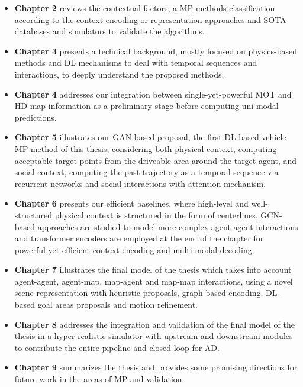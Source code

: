 \begin{itemize}
	
	\item \textbf{Chapter 2} reviews the contextual factors, a \ac{MP} methods classification according to the context encoding or representation approaches and \ac{SOTA} databases and simulators to validate the algorithms. 
	
	\item \textbf{Chapter 3} presents a technical background, mostly focused on physics-based methods and \ac{DL} mechanisms to deal with temporal sequences and interactions, to deeply understand the proposed methods.
	
	\item \textbf{Chapter 4} addresses our integration between single-yet-powerful \ac{MOT} and HD map information as a preliminary stage before computing uni-modal predictions.
	
	\item \textbf{Chapter 5} illustrates our \ac{GAN}-based proposal, the first \ac{DL}-based vehicle \ac{MP} method of this thesis, considering both physical context, computing acceptable target points from the driveable area around the target agent, and social context, computing the past trajectory as a temporal sequence via recurrent networks and social interactions with attention mechanism.
	
	\item \textbf{Chapter 6} presents our efficient baselines, where high-level and well-structured physical context is structured in the form of centerlines, \ac{GCN}-based approaches are studied to model more complex agent-agent interactions and transformer encoders are employed at the end of the chapter for powerful-yet-efficient context encoding and multi-modal decoding.
	
	\item \textbf{Chapter 7} illustrates the final model of the thesis which takes into account agent-agent, agent-map, map-agent and map-map interactions, using a novel scene representation with heuristic proposals, graph-based encoding, \ac{DL}-based goal areas proposals and motion refinement.
	
	\item \textbf{Chapter 8} addresses the integration and validation of the final model of the thesis in a hyper-realistic simulator with upstream and downstream modules to contribute the entire pipeline and closed-loop for \ac{AD}.
	
	\item \textbf{Chapter 9} summarizes the thesis and provides some promising directions for future work in the areas of \ac{MP} and validation.
	
\end{itemize}
